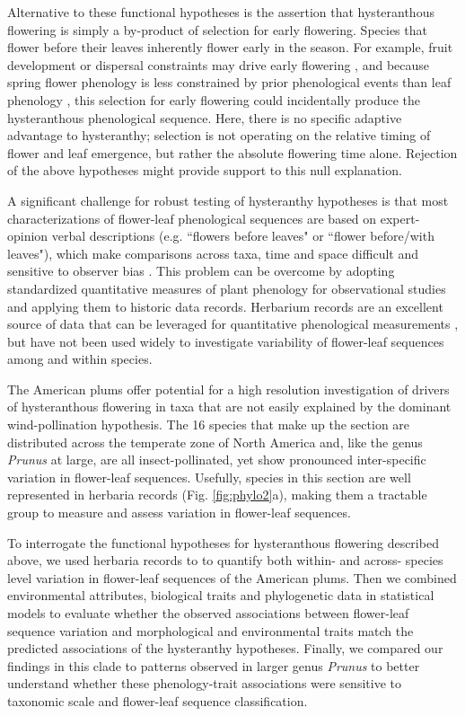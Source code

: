 \documentclass{article}[12pt]
\begin{document}
Alternative to these functional hypotheses is the assertion that hysteranthous flowering is simply a by-product of selection for early flowering. Species that flower before their leaves inherently flower early in the season. For example, fruit development or dispersal constraints may drive early flowering \citep{Primack1987}, and because spring flower phenology is less constrained by prior phenological events than leaf phenology \citep{Savage2019,Ettinger2018}, this selection for early flowering could incidentally produce the hysteranthous phenological sequence. Here, there is no specific adaptive advantage to hysteranthy;  selection is not operating on the relative timing of flower and leaf emergence, but rather the absolute flowering time alone. Rejection of the above hypotheses might provide support to this null explanation. 

\noindent A significant challenge for robust testing of hysteranthy hypotheses is that most characterizations of flower-leaf phenological sequences are based on expert-opinion verbal descriptions (e.g. ``flowers before leaves" or ``flower before/with leaves"), which make comparisons across taxa, time and space difficult and sensitive to observer bias  \citep[see;][]{Buonaiuto2020}. This problem can be overcome by adopting standardized quantitative measures of plant phenology for observational studies and applying them to historic data records. Herbarium records are an excellent source of data that can be leveraged for quantitative phenological measurements \citep{Willis2017}, but have not been used widely to investigate variability of flower-leaf sequences among and within species.

\noindent The American plums offer potential for a high resolution investigation of drivers of hysteranthous flowering in taxa that are not easily explained by the dominant wind-pollination hypothesis. The 16 species that make up the section are distributed across the temperate zone of North America and, like the genus \textit{Prunus} at large, are all insect-pollinated, yet show pronounced inter-specific variation in flower-leaf sequences. Usefully, species in this section are well represented in herbaria records (Fig. \ref{fig:phylo2}a), making them a tractable group to measure and assess variation in flower-leaf sequences.

\noindent To interrogate the functional hypotheses for hysteranthous flowering described above, we used herbaria records to to quantify both within- and across- species level variation in flower-leaf sequences of the American plums. Then we combined environmental attributes, biological traits and phylogenetic data in statistical models to evaluate whether the observed associations between flower-leaf sequence variation and morphological and environmental traits match the predicted associations of the hysteranthy hypotheses. Finally, we compared our findings in this clade to patterns observed in larger genus \emph{Prunus} to better understand whether these phenology-trait associations were sensitive to taxonomic scale and flower-leaf sequence classification.
\end{document}
